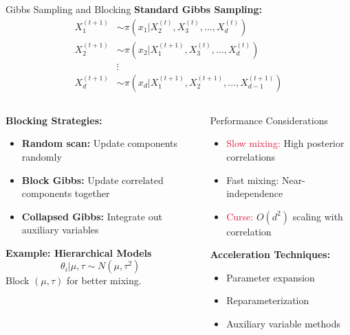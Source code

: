 \documentclass[aspectratio=169,11pt]{beamer}
\begin{document}
\begin{frame}{Gibbs Sampling and Blocking}
\textbf{Standard Gibbs Sampling:}
\begin{align}
X_1^{(t+1)} &\sim \pi(x_1 | X_2^{(t)}, X_3^{(t)}, \ldots, X_d^{(t)}) \\
X_2^{(t+1)} &\sim \pi(x_2 | X_1^{(t+1)}, X_3^{(t)}, \ldots, X_d^{(t)}) \\
&\vdots \\
X_d^{(t+1)} &\sim \pi(x_d | X_1^{(t+1)}, X_2^{(t+1)}, \ldots, X_{d-1}^{(t+1)})
\end{align}

\begin{columns}
\begin{column}{0.5\textwidth}
\textbf{Blocking Strategies:}
\begin{itemize}
\item \textbf{Random scan:} Update components randomly
\item \textbf{Block Gibbs:} Update correlated components together
\item \textbf{Collapsed Gibbs:} Integrate out auxiliary variables
\end{itemize}

\textbf{Example: Hierarchical Models}
\[\theta_i | \mu, \tau \sim N(\mu, \tau^2)\]
Block $(\mu, \tau)$ for better mixing.
\end{column}
\begin{column}{0.5\textwidth}
\begin{alertblock}{Performance Considerations}
\begin{itemize}
\item \textcolor{crimson}{Slow mixing:} High posterior correlations
\item \textcolor{forest}{Fast mixing:} Near-independence
\item \textcolor{crimson}{Curse:} $O(d^2)$ scaling with correlation
\end{itemize}
\end{alertblock}

\textbf{Acceleration Techniques:}
\begin{itemize}
\item Parameter expansion
\item Reparameterization
\item Auxiliary variable methods
\end{itemize}
\end{column}
\end{columns}
\end{frame}
\end{document}
